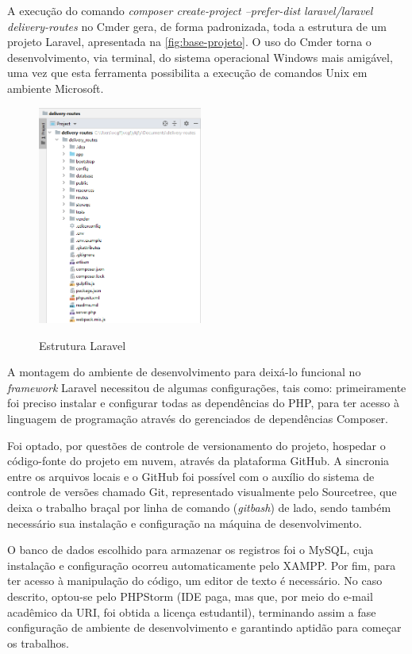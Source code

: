 A execução do comando \textit{composer create-project --prefer-dist laravel/laravel delivery-routes} no Cmder gera, de forma padronizada, toda a estrutura de um projeto Laravel, apresentada na \autoref{fig:base-projeto}. O uso do Cmder torna o desenvolvimento, via terminal, do sistema operacional Windows mais amigável, uma vez que esta ferramenta possibilita a execução de comandos Unix em ambiente Microsoft.

\begin{figure}[H]
    \centering
    \caption{Estrutura Laravel}
    \includegraphics[width=0.48\textwidth]{./dados/figuras/fig6}
    \label{fig:base-projeto}
\end{figure}

A montagem do ambiente de desenvolvimento para deixá-lo funcional no \textit{framework} Laravel necessitou de algumas configurações, tais como: primeiramente foi preciso instalar e configurar todas as dependências do PHP, para ter acesso à linguagem de programação através do gerenciados de dependências Composer.

Foi optado, por questões de controle de versionamento do projeto, hospedar o código-fonte do projeto em nuvem, através da plataforma GitHub. A sincronia entre os arquivos locais e o GitHub foi possível com o auxílio do sistema de controle de versões chamado Git, representado visualmente pelo Sourcetree, que deixa o trabalho braçal por linha de comando (\textit{gitbash}) de lado, sendo também necessário sua instalação e configuração na máquina de desenvolvimento. 

O banco de dados escolhido para armazenar os registros foi o MySQL, cuja instalação e configuração ocorreu automaticamente pelo XAMPP. Por fim, para ter acesso à manipulação do código, um editor de texto é necessário. No caso descrito, optou-se pelo PHPStorm (IDE paga, mas que, por meio do e-mail acadêmico da URI, foi obtida a licença estudantil), terminando assim a fase configuração de ambiente de desenvolvimento e garantindo aptidão para começar os trabalhos.

